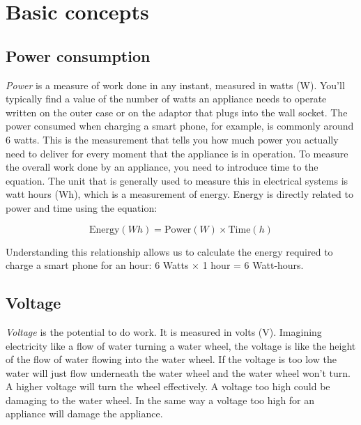 \documentclass{article}
\theoremstyle{definition}
\theoremstyle{definition}
\theoremstyle{remark}
\begin{document}

  \newpage  


\section{Basic concepts} %
\label{sec:basic_concepts}
  
  \subsection{Power consumption} %
  \label{sub:power_consumption}

    \textit{Power} is a measure of work done in any instant, measured in watts (W). You'll typically find a value of the number of watts an appliance needs to operate written on the outer case or on the adaptor that plugs into the wall socket. The power consumed when charging a smart phone, for example, is commonly around 6 watts. This is the measurement that tells you how much power you actually need to deliver for every moment that the appliance is in operation. To measure the overall work done by an appliance, you need to introduce time to the equation. The unit that is generally used to measure this in electrical systems is watt hours (Wh), which is a measurement of energy. Energy is directly related to power and time using the equation: 

    \begin{equation}
      \text{Energy} (Wh) = \text{Power} (W) \times \text{Time} (h)
    \end{equation}
    
    Understanding this relationship allows us to calculate the energy required to charge a smart phone for an hour: 6 Watts \(\times\) 1 hour = 6 Watt-hours.
  

  \subsection{Voltage} %
  \label{sub:voltage}

    \textit{Voltage} is the potential to do work. It is measured in volts (V). Imagining electricity like a flow of water turning a water wheel, the voltage is like the height of the flow of water flowing into the water wheel. If the voltage is too low the water will just flow underneath the water wheel and the water wheel won't turn. A higher voltage will turn the wheel effectively. A voltage too high could be damaging to the water wheel. In the same way a voltage too high for an appliance will damage the appliance.
  
\end{document}
